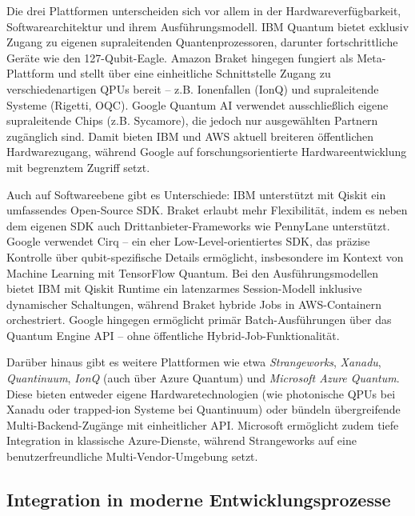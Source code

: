 Die drei Plattformen unterscheiden sich vor allem in der Hardwareverfügbarkeit, Softwarearchitektur und ihrem Ausführungsmodell. IBM Quantum bietet exklusiv Zugang zu eigenen supraleitenden Quantenprozessoren, darunter fortschrittliche Geräte wie den 127-Qubit-Eagle. Amazon Braket hingegen fungiert als Meta-Plattform und stellt über eine einheitliche Schnittstelle Zugang zu verschiedenartigen QPUs bereit – z.B. Ionenfallen (IonQ) und supraleitende Systeme (Rigetti, OQC). Google Quantum AI verwendet ausschließlich eigene supraleitende Chips (z.B. Sycamore), die jedoch nur ausgewählten Partnern zugänglich sind. Damit bieten IBM und AWS aktuell breiteren öffentlichen Hardwarezugang, während Google auf forschungsorientierte Hardwareentwicklung mit begrenztem Zugriff setzt.

Auch auf Softwareebene gibt es Unterschiede: IBM unterstützt mit Qiskit ein umfassendes Open-Source SDK. Braket erlaubt mehr Flexibilität, indem es neben dem eigenen SDK auch Drittanbieter-Frameworks wie PennyLane unterstützt. Google verwendet Cirq – ein eher Low-Level-orientiertes SDK, das präzise Kontrolle über qubit-spezifische Details ermöglicht, insbesondere im Kontext von Machine Learning mit TensorFlow Quantum. Bei den Ausführungsmodellen bietet IBM mit Qiskit Runtime ein latenzarmes Session-Modell inklusive dynamischer Schaltungen, während Braket hybride Jobs in AWS-Containern orchestriert. Google hingegen ermöglicht primär Batch-Ausführungen über das Quantum Engine API – ohne öffentliche Hybrid-Job-Funktionalität. \autocite{googleGoogleQuantumComputing2025} \autocite{mittalQiskitRuntimeCloudNative2022} \autocite{amazonwebservicesAmazonBraketFeatures2025}

Darüber hinaus gibt es weitere Plattformen wie etwa \textit{Strangeworks}, \textit{Xanadu}, \textit{Quantinuum}, \textit{IonQ} (auch über Azure Quantum) und \textit{Microsoft Azure Quantum}. Diese bieten entweder eigene Hardwaretechnologien (wie photonische QPUs bei Xanadu oder trapped-ion Systeme bei Quantinuum) oder bündeln übergreifende Multi-Backend-Zugänge mit einheitlicher API. Microsoft ermöglicht zudem tiefe Integration in klassische Azure-Dienste, während Strangeworks auf eine benutzerfreundliche Multi-Vendor-Umgebung setzt.

\subsection{Integration in moderne Entwicklungsprozesse}
\label{sec:integration-devops}

